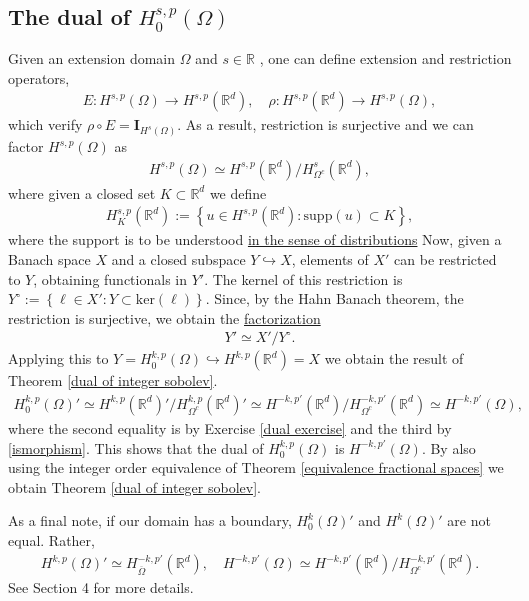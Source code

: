 \documentclass[
    a4paper,
    DIV=14,
    abstract=true,
    numbers=noenddot
]
{scrartcl}
\theoremstyle{definition}
\newcommand{\set}[1]{\left\{#1\right\}}
\newcommand{\Id}{\bm{I}}\renewcommand{\ker}{\bm{ker}}\newcommand{\supp}[1]{\bm{supp}(#1)}\renewcommand{\tr}[1]{\mathrm{tr}\left(#1\right)}
\newcommand{\rm}[1]{\mathrm{#1}}
\newcommand{\R}{\mathbb{R}}
\begin{document}
\subsection{The dual of $H^{s,p}_0(\Omega)$}
Given an extension domain $\Omega $ and $s \in \R$ , one can define extension and restriction operators,
\begin{align*}
  E:H^{s,p}(\Omega ) \to H^{s,p}(\R^d), \quad \rho: H^{s,p}(\R^d) \to H^{s,p}(\Omega ),
\end{align*}
which verify $\rho \circ E = \Id_{H^s(\Omega )}$. As a result, restriction is surjective and we can factor $H^{s,p}(\Omega )$ as
\begin{align}\label{ismorphism}
  H^{s,p}(\Omega )\simeq H^{s,p}(\R^d)\slash H^s_{\Omega^c}(\R^d ),
\end{align}
where given a closed set $K \subset \R^d$ we define
\begin{align*}
  H^{s,p}_K(\R^d):= \set{u \in H^{s,p}(\R^d): \rm{supp}(u) \subset K},
\end{align*}
where the support is to be understood \href{https://nowheredifferentiable.com/2023-07-12-PDEs-3-Sobolev_spaces/#:~:text=Support%20of%20a%20distribution}{in the sense of distributions}
Now, given a Banach space $X$ and a closed subspace $Y \hookrightarrow X$, elements of $X'$ can be restricted to $Y$, obtaining functionals in $Y'$. The kernel of this restriction is $Y^\circ:=\set{\ell \in X': Y \subset \rm{ker}(\ell)}$. Since, by the Hahn Banach theorem, the restriction is surjective, we obtain the \href{https://math.la.asu.edu/~quigg/teach/courses/578/2008/notes/adjoints.pdf}{factorization}
\begin{align}\label{dual isomormphism}
  Y' \simeq X'\slash Y^\circ.
\end{align}
Applying this to $Y= H^{k,p}_0(\Omega )\hookrightarrow H^{k,p}(\R^d) =X$ we obtain the result of Theorem \ref{dual of integer sobolev}.
\begin{align*}
  H^{k,p}_0(\Omega )' \simeq H^{k,p}(\R^d)'\slash H^{k,p}_{\Omega^c}(\R^d)'\simeq H^{-k,p'}(\R^d)\slash H^{-k,p'}_{\Omega^c}(\R^d )\simeq H^{-k,p'}(\Omega ),
\end{align*}
where the second equality is by Exercise \ref{dual exercise} and the third by \eqref{ismorphism}.
This shows that the dual of $H^{k,p}_0(\Omega )$ is $H^{-k,p'}(\Omega )$. By also using the integer order equivalence of Theorem \ref{equivalence fractional spaces} we obtain  Theorem \ref{dual of integer sobolev}.

As a final note, if our domain has a boundary, $H_0^k(\Omega )'$ and $H^k(\Omega )'$ are not equal. Rather,
\begin{align*}
  H^{k,p}(\Omega )'\simeq H_{\overline{\Omega } }^{-k,p'}(\R^d), \quad H^{-k,p'}(\Omega ) \simeq H^{-k,p'}(\R^d)\slash H^{-k,p'}_{{\Omega }^c }(\R^d).
\end{align*}
See \cite{taylor2013partial} Section 4 for more details.
\end{document}
